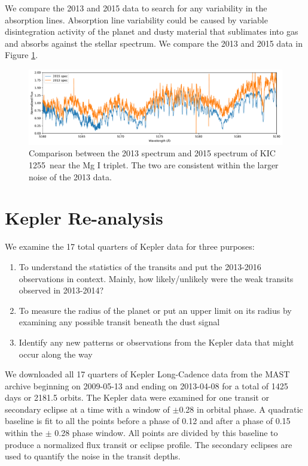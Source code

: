 \documentclass[preprint]{aastex61}
\newcommand{\shStar}{KIC 1255}
\begin{document}
We compare the 2013 and 2015 data to search for any variability in the absorption lines.
Absorption line variability could be caused by variable disintegration activity of the planet and dusty material that sublimates into gas and absorbs against the stellar spectrum.
We compare the 2013 and 2015 data in Figure \ref{fig:spec2013vs2015}.
\begin{figure}[!hbtp]
\begin{centering}
\includegraphics[width=1.0\textwidth]{images/subaru/2013_vs_2015/2013_vs_2015_spec.pdf}
\caption{Comparison between the 2013 spectrum and 2015 spectrum of \shStar\ near the Mg I triplet. The two are consistent within the larger noise of the 2013 data.}\label{fig:spec2013vs2015}
\end{centering}
\end{figure}

\clearpage

\section{Kepler Re-analysis}
We examine the 17 total quarters of Kepler data for three purposes:
\begin{enumerate}
	\item To understand the statistics of the transits and put the 2013-2016 observations in context. Mainly, how likely/unlikely were the weak transits observed in 2013-2014?
	\item To measure the radius of the planet or put an upper limit on its radius by examining any possible transit beneath the dust signal
	\item Identify any new patterns or observations from the Kepler data that might occur along the way
\end{enumerate}

We downloaded all 17 quarters of Kepler Long-Cadence data from the MAST archive beginning on 2009-05-13 and ending on 2013-04-08 for a total of 1425 days or 2181.5 orbits.
The Kepler data were examined for one transit or secondary eclipse at a time with a window of $\pm$0.28 in orbital phase.
A quadratic baseline is fit to all the points before a phase of 0.12 and after a phase of 0.15 within the $\pm$ 0.28 phase window.
All points are divided by this baseline to produce a normalized flux transit or eclipse profile.
The secondary eclipses are used to quantify the noise in the transit depths.
\end{document}
